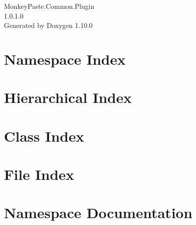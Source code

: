 \documentclass[twoside]{book}
\newcommand{\+}{\discretionary{\mbox{\scriptsize$\hookleftarrow$}}{}{}}
\newcommand{\clearemptydoublepage}{%
    \newpage{\pagestyle{empty}\cleardoublepage}%
  }
\begin{document}
  \raggedbottom
    \hypersetup{pageanchor=false,
                bookmarksnumbered=true,
                pdfencoding=unicode
               }
  \begin{titlepage}
  \vspace*{7cm}
  \begin{center}%
  {\Large Monkey\+Paste.\+Common.\+Plugin}\\
  [1ex]\large 1.\+0.\+1.\+0 \\
  \vspace*{1cm}
  {\large Generated by Doxygen 1.10.0}\\
  \end{center}
  \end{titlepage}
  \clearemptydoublepage
  \tableofcontents
  \clearemptydoublepage
  \hypersetup{pageanchor=true}

\chapter{Namespace Index}

\chapter{Hierarchical Index}

\chapter{Class Index}

\chapter{File Index}

\chapter{Namespace Documentation}



\end{document}
